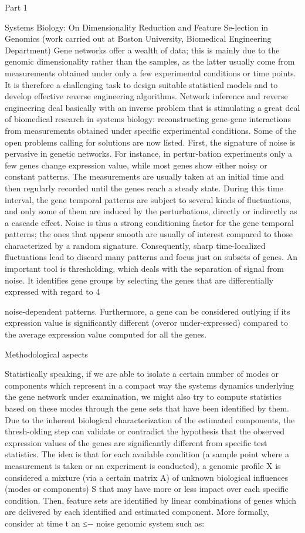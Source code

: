 \documentclass[11pt]{article}
\begin{document}
Part 1

Systems Biology: On Dimensionality Reduction and Feature Se-lection in Genomics (work carried out at Boston University, Biomedical Engineering Department) Gene networks offer a wealth of data; this is mainly due to the genomic dimensionality rather than the samples, as the latter usually come from measurements obtained under only a few experimental conditions or time points. It is therefore a challenging task to design suitable statistical models and to develop effective reverse engineering algorithms. Network inference and reverse engineering deal basically with an inverse problem that is stimulating a great deal of biomedical research in systems biology: reconstructing gene-gene interactions from measurements obtained under specific experimental conditions. Some of the open problems calling for solutions are now listed. First, the signature of noise is pervasive in genetic networks. For instance, in pertur-bation experiments only a few genes change expression value, while most genes show either noisy or constant patterns. The measurements are usually taken at an initial time and then regularly recorded until the genes reach a steady state. During this time interval, the gene temporal patterns are subject to several kinds of fluctuations, and only some of them are induced by the perturbations, directly or indirectly as a cascade effect. Noise is thus a strong conditioning factor for the gene temporal patterns; the ones that appear smooth are usually of interest compared to those characterized by a random signature. Consequently, sharp time-localized fluctuations lead to discard many patterns and focus just on subsets of genes. An important tool is thresholding, which deals with the separation of signal from noise. It identifies gene groups by selecting the genes that are differentially expressed with regard to 4

noise-dependent patterns. Furthermore, a gene can be considered outlying if its expression value is significantly different (overor under-expressed) compared to the average expression value computed for all the genes.

Methodological aspects

Statistically speaking, if we are able to isolate a certain number of modes or components which represent in a compact way the systems dynamics underlying the gene network under examination, we might also try to compute statistics based on these modes through the gene sets that have been identified by them. Due to the inherent biological characterization of the estimated components, the thresh-olding step can validate or contradict the hypothesis that the observed expression values of the genes are significantly different from specific test statistics. The idea is that for each available condition (a sample point where a measurement is taken or an experiment is conducted), a genomic profile X is considered a mixture (via a certain matrix A) of unknown biological influences (modes or components) S that may have more or less impact over each specific condition. Then, feature sets are identified by linear combinations of genes which are delivered by each identified and estimated component. More formally, consider at time t an ≤− noise genomic system such as:
\end{document}
